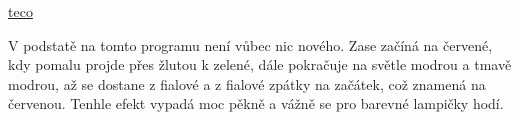 \href{https://www.tecomat.cz/products/}{teco}

%



V podstatě na tomto programu není vůbec nic nového. Zase začíná na červené, kdy pomalu projde přes žlutou k zelené, dále pokračuje na světle modrou a tmavě modrou, až se dostane z fialové a z fialové zpátky na začátek, což znamená na červenou. Tenhle efekt vypadá moc pěkně a vážně se pro barevné lampičky hodí. 



\newpage